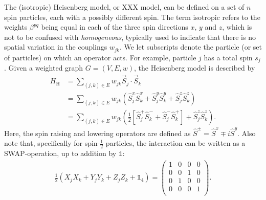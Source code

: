 The (isotropic) Heisenberg model, or XXX model, can be defined on a set of $n$ spin particles, each with a possibly different spin. The term isotropic refers to the weights $\beta^{pq}$ being equal in each of the three spin directions $x$, $y$ and $z$, which is not to be confused with \emph{homogeneous}, typically used to indicate that there is no spatial variation in the couplings $w_{jk}$. We let subscripts denote the particle (or set of particles) on which an operator acts. For example, particle $j$ has a total spin $s_j$. Given a weighted graph $G = (V,E,w)$, the Heisenberg model is described by 
\begin{align}
H_\text{H} &=  \sum_{(j,k) \in E} w_{jk} \vec{S}_j \cdot \vec{S}_k 		\nonumber \\
&=  \sum_{(j,k) \in E} w_{jk} \left( \hat{S}^x_j \hat{S}^x_k + \hat{S}^y_j \hat{S}^y_k + \hat{S}^z_j \hat{S}^z_k \right)  	\label{eqn:intro_heisenberg} \\
&= \sum_{(j,k) \in E} w_{jk} \left( \frac{1}{2} \left[ \hat{S}^+_j \hat{S}^-_k + \hat{S}^-_j \hat{S}^+_k  \right] + \hat{S}^z_j \hat{S}^z_k \right).  \nonumber
\end{align}
%
Here, the spin raising and lowering operators are defined as $\hat{S}^\pm = \hat{S}^x \mp i \hat{S}^y$. Also note that, specifically for spin-$\frac{1}{2}$ particles, the interaction can be written as a SWAP-operation, up to addition by $\mathds{1}$:
\begin{align}
\frac{1}{2} \left( X_j X_k + Y_j Y_k  +  Z_j Z_k + \mathds{1}_4 \right) = \begin{pmatrix}
1 & 0 & 0 & 0 \\
0 & 0 & 1 & 0 \\
0 & 1 & 0 & 0 \\
0 & 0 & 0 & 1 \\
\end{pmatrix}.
\label{eqn:heisenbergswap}
\end{align}

